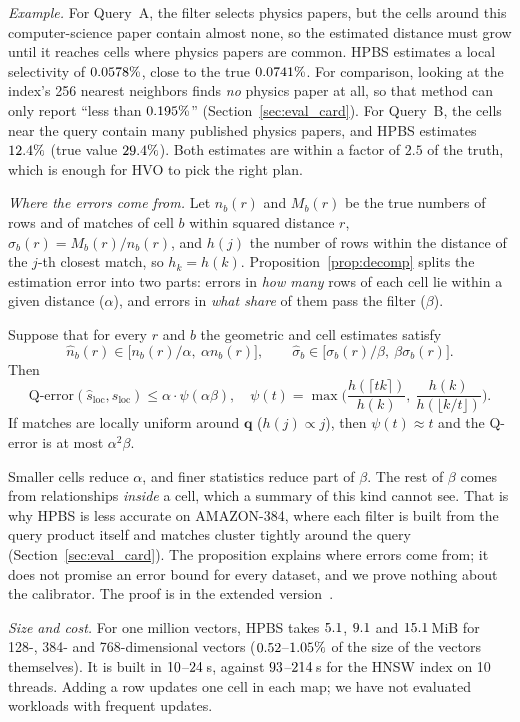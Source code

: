 \documentclass[sigconf, nonacm]{acmart}
\newcommand{\sloc}{s_{\text{loc}}}
\begin{document}
\emph{Example.} For Query~A, the filter selects physics papers, but the cells around this computer-science paper contain almost none, so the estimated distance must grow until it reaches cells where physics papers are common. HPBS estimates a local selectivity of $0.0578\%$, close to the true $0.0741\%$. For comparison, looking at the index's 256 nearest neighbors finds \emph{no} physics paper at all, so that method can only report ``less than $0.195\%$'' (Section~\ref{sec:eval_card}). For Query~B, the cells near the query contain many published physics papers, and HPBS estimates $12.4\%$ (true value $29.4\%$). Both estimates are within a factor of $2.5$ of the truth, which is enough for HVO to pick the right plan.

\emph{Where the errors come from.} Let $n_b(r)$ and $M_b(r)$ be the true numbers of rows and of matches of cell $b$ within squared distance $r$, $\sigma_b(r)=M_b(r)/n_b(r)$, and $h(j)$ the number of rows within the distance of the $j$-th closest match, so $h_k=h(k)$. Proposition~\ref{prop:decomp} splits the estimation error into two parts: errors in \emph{how many} rows of each cell lie within a given distance ($\alpha$), and errors in \emph{what share} of them pass the filter ($\beta$).
\begin{proposition}\label{prop:decomp}
Suppose that for every $r$ and $b$ the geometric and cell estimates satisfy
\[
\hat n_b(r)\in\big[n_b(r)/\alpha,\ \alpha n_b(r)\big],\qquad \hat\sigma_b\in\big[\sigma_b(r)/\beta,\ \beta\sigma_b(r)\big].
\]
Then
\[
\text{Q-error}(\hat s_{\text{loc}}, \sloc) \le \alpha\cdot\psi(\alpha\beta), \quad \psi(t)=\max\Big(\frac{h(\lceil tk\rceil)}{h(k)},\ \frac{h(k)}{h(\lfloor k/t\rfloor)}\Big).
\]
If matches are locally uniform around $\mathbf{q}$ ($h(j)\propto j$), then $\psi(t)\approx t$ and the Q-error is at most $\alpha^2\beta$.
\end{proposition}
Smaller cells reduce $\alpha$, and finer statistics reduce part of $\beta$. The rest of $\beta$ comes from relationships \emph{inside} a cell, which a summary of this kind cannot see. That is why HPBS is less accurate on AMAZON-384, where each filter is built from the query product itself and matches cluster tightly around the query (Section~\ref{sec:eval_card}). The proposition explains where errors come from; it does not promise an error bound for every dataset, and we prove nothing about the calibrator. The proof is in the extended version~\cite{hvoextended}.

\emph{Size and cost.} For one million vectors, HPBS takes $5.1$, $9.1$ and $15.1$\,MiB for 128-, 384- and 768-dimensional vectors ($0.52$--$1.05\%$ of the size of the vectors themselves). It is built in $10$--$24$\,s, against $93$--$214$\,s for the HNSW index on 10 threads. Adding a row updates one cell in each map; we have not evaluated workloads with frequent updates.
\end{document}
